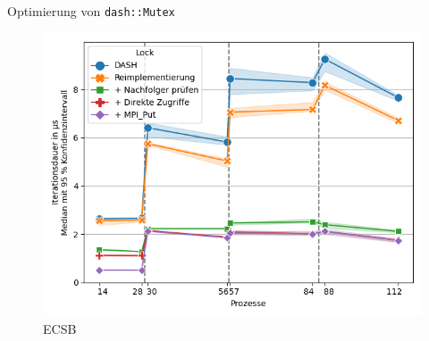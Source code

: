 \documentclass[fleqn,compress,utf8,aspectratio=169,t]{beamer}
\begin{document}
\begin{frame}{Optimierung von \texttt{dash::Mutex}}
\begin{minipage}{.49\textwidth}
\begin{figure}
            \includegraphics[width=\textwidth]{../../Dokumentation/Latex/Bilder/benchmarks/intelmpi/dash-optimization/ECSB-latency}
            \caption{ECSB}
        \end{figure}
    \end{minipage}
\end{frame}
\end{document}
